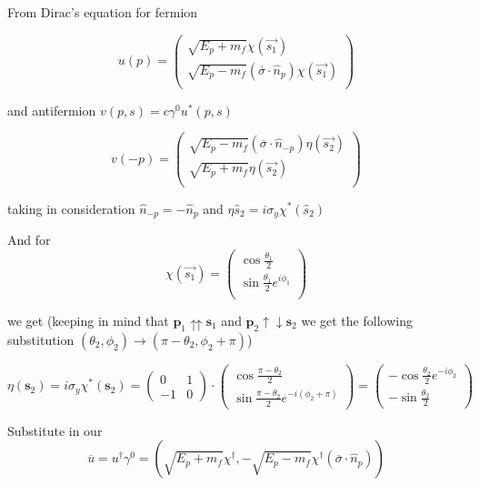 \documentclass[12pt]{article}
\begin{document}
	From Dirac's equation for fermion
	
	\[
	u(p) = 
	\begin{pmatrix}
		\sqrt{E_p + m_f} \chi(\vec{s_1})\\
		\sqrt{E_p - m_f} (\overline{\sigma} \cdot \hat{n}_p) \chi(\vec{s_1})\\
	\end{pmatrix}
	\]
	
	and antifermion $v(p,s)=c \gamma^0 u^* (p,s)$
	
	\[
	v(-p) = 
	\begin{pmatrix}
		\sqrt{E_p - m_f} (\overline{\sigma} \cdot \hat{n}_{-p}) \eta(\vec{s_2})\\
		\sqrt{E_p + m_f} \eta(\vec{s_2})\\
	\end{pmatrix}
	\]
	
	taking in consideration $\hat{n}_{-p} = - \hat{n}_p$ and $\eta{\hat{s}_2} = i \sigma_y \chi^*(\hat{s}_2)$
	
	And for 
	\[
	\chi(\vec{s_1}) = 
	\begin{pmatrix}
		\cos \frac{\theta_1}{2}\\
		\sin \frac{\theta_1}{2} e^{i \phi_1}\\
	\end{pmatrix}
	\]
	
	we get (keeping in mind that $\bm{p}_1 \upuparrows \bm{s}_1$ and $\bm{p}_2 \mathrel{\uparrow\downarrow} \bm{s}_2$ we get the following substitution $(\theta_2, \phi_2) \rightarrow (\pi - \theta_2, \phi_2 + \pi)$)
	
    \[
	\eta(\bm{s}_2) = i \sigma_y \chi^* (\bm{s}_2)
	= 
	\begin{pmatrix}
		0 & 1 \\
		-1 & 0
	\end{pmatrix}
	\cdot
	\begin{pmatrix}
		\cos \frac{\pi - \theta_2}{2} \\
		\sin \frac{\pi - \theta_2}{2} e^{-i \left(\phi_2 + \pi\right)}
	\end{pmatrix}
	=
	\begin{pmatrix}
		  - \cos \frac{\theta_2}{2} e^{- i \phi_2}\\
		- \sin \frac{\theta_2}{2} 
	\end{pmatrix}
	\]
	
	Substitute in our 
	\[
	\overline{u} = u^{\dagger} \gamma^0 = (\sqrt{E_p + m_f} \chi^{\dagger}, -\sqrt{E_p - m_f} \chi^{\dagger} (\overline{\sigma} \cdot \hat{n}_p))
	\]
	
\end{document}

